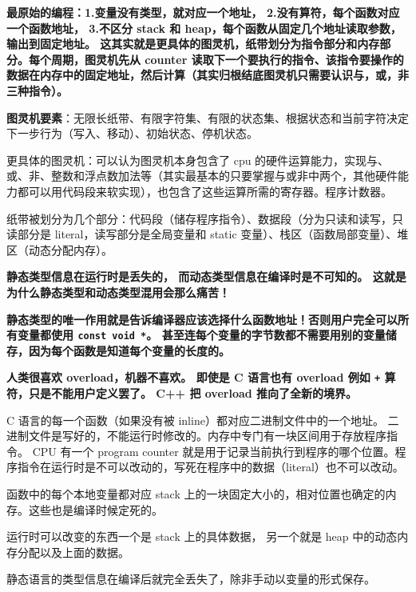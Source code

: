 
\begin{issues}
\issueDraft
\end{issues}

\textbf{最原始的编程：1.变量没有类型，就对应一个地址， 2.没有算符，每个函数对应一个函数地址， 3.不区分 stack 和 heap，每个函数从固定几个地址读取参数，输出到固定地址。 这其实就是更具体的图灵机，纸带划分为指令部分和内存部分。每个周期，图灵机先从 counter 读取下一个要执行的指令、该指令要操作的数据在内存中的固定地址，然后计算（其实归根结底图灵机只需要认识与，或，非三种指令）。}

\textbf{图灵机要素}：无限长纸带、有限字符集、有限的状态集、根据状态和当前字符决定下一步行为（写入、移动）、初始状态、停机状态。

更具体的图灵机：可以认为图灵机本身包含了 cpu 的硬件运算能力，实现与、或、非、整数和浮点数加法等（其实最基本的只要掌握与或非中两个，其他硬件能力都可以用代码段来软实现），也包含了这些运算所需的寄存器。程序计数器。

纸带被划分为几个部分：代码段（储存程序指令）、数据段（分为只读和读写，只读部分是 literal，读写部分是全局变量和 static 变量）、栈区（函数局部变量）、堆区（动态分配内存）。

\textbf{静态类型信息在运行时是丢失的， 而动态类型信息在编译时是不可知的。 这就是为什么静态类型和动态类型混用会那么痛苦！}

\textbf{静态类型的唯一作用就是告诉编译器应该选择什么函数地址！否则用户完全可以所有变量都使用 \verb`const void *`。 甚至连每个变量的字节数都不需要用别的变量储存，因为每个函数是知道每个变量的长度的。}

\textbf{人类很喜欢 overload，机器不喜欢。 即使是 C 语言也有 overload 例如 \verb`+` 算符，只是不能用户定义罢了。 C++ 把 overload 推向了全新的境界。}

C 语言的每一个函数（如果没有被 inline）都对应二进制文件中的一个地址。 二进制文件是写好的，不能运行时修改的。内存中专门有一块区间用于存放程序指令。 CPU 有一个 program counter 就是用于记录当前执行到程序的哪个位置。程序指令在运行时是不可以改动的，写死在程序中的数据（literal）也不可以改动。

函数中的每个本地变量都对应 stack 上的一块固定大小的，相对位置也确定的内存。这些也是编译时候定死的。

运行时可以改变的东西一个是 stack 上的具体数据， 另一个就是 heap 中的动态内存分配以及上面的数据。

静态语言的类型信息在编译后就完全丢失了，除非手动以变量的形式保存。

